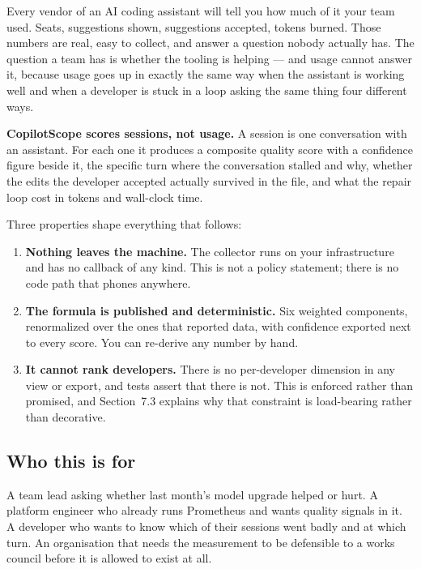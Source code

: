 \documentclass[11pt,a4paper]{article}
\newcommand{\finding}[1]{{\color{primaryblue}\textbf{#1}}}
\begin{document}
Every vendor of an AI coding assistant will tell you how much of it your team
used. Seats, suggestions shown, suggestions accepted, tokens burned. Those
numbers are real, easy to collect, and answer a question nobody actually has.
The question a team has is whether the tooling is helping --- and usage cannot
answer it, because usage goes up in exactly the same way when the assistant is
working well and when a developer is stuck in a loop asking the same thing four
different ways.

\finding{CopilotScope scores sessions, not usage.} A session is one conversation
with an assistant. For each one it produces a composite quality score with a
confidence figure beside it, the specific turn where the conversation stalled
and why, whether the edits the developer accepted actually survived in the file,
and what the repair loop cost in tokens and wall-clock time.

Three properties shape everything that follows:

\begin{enumerate}[leftmargin=*]
    \item \textbf{Nothing leaves the machine.} The collector runs on your
    infrastructure and has no callback of any kind. This is not a policy
    statement; there is no code path that phones anywhere.
    \item \textbf{The formula is published and deterministic.} Six weighted
    components, renormalized over the ones that reported data, with confidence
    exported next to every score. You can re-derive any number by hand.
    \item \textbf{It cannot rank developers.} There is no per-developer
    dimension in any view or export, and tests assert that there is not. This is
    enforced rather than promised, and Section~7.3 explains why that
    constraint is load-bearing rather than decorative.
\end{enumerate}

\subsection{Who this is for}

A team lead asking whether last month's model upgrade helped or hurt. A platform
engineer who already runs Prometheus and wants quality signals in it. A
developer who wants to know which of their sessions went badly and at which
turn. An organisation that needs the measurement to be defensible to a works
council before it is allowed to exist at all.
\end{document}
